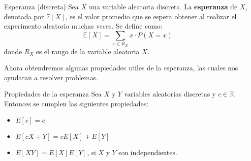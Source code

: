 \begin{definicion}{Esperanza (discreta)}
    Sea $X$ una variable aleatoria discreta. La \textbf{esperanza} de $X$, denotada por $\mathbb{E}[X]$, es el valor
    promedio que se espera obtener al realizar el experimento aleatorio muchas veces. Se define como:
    $$
        \mathbb{E}[X] = \sum_{x \in R_X} x \cdot P(X = x)
    $$
    donde $R_X$ es el rango de la variable aleatoria $X$.
\end{definicion}

Ahora obtendremos algunas propiedades utiles de la esperanza, las cuales nos ayudaran a resolver problemas.

\begin{definicion}{Propiedades de la esperanza}
    Sea $X$ y $Y$ variables aleatorias discretas y $c \in \mathbb{R}$. Entonces se cumplen las siguientes propiedades:
    \begin{itemize}
        \item $E[c] = c$
        \item $E[cX + Y] = cE[X] + E[Y]$
        \item $E[XY] = E[X]E[Y]$, si $X$ y $Y$ son independientes.
    \end{itemize}
\end{definicion}

